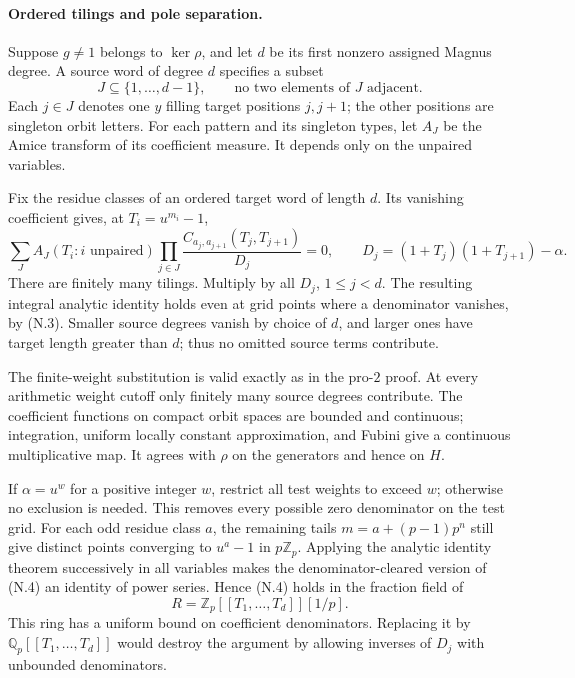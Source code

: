 \documentclass[11pt,a4paper]{article}
\theoremstyle{definition}
\begin{document}
\paragraph{Ordered tilings and pole separation.}
Suppose $g\ne1$ belongs to $\ker\rho$, and let $d$ be its first nonzero assigned Magnus degree. A source word of degree $d$ specifies a subset
\[
 J\subseteq\{1,\ldots,d-1\},\qquad
 \text{no two elements of }J\text{ adjacent}.
\]
Each $j\in J$ denotes one $y$ filling target positions $j,j+1$; the other positions are singleton orbit letters. For each pattern and its singleton types, let $A_J$ be the Amice transform of its coefficient measure. It depends only on the unpaired variables.

Fix the residue classes of an ordered target word of length $d$. Its vanishing coefficient gives, at $T_i=u^{m_i}-1$,
\[
 \sum_J A_J(T_i:i\text{ unpaired})
       \prod_{j\in J}
       \frac{C_{a_j,a_{j+1}}(T_j,T_{j+1})}{D_j}=0,
 \qquad D_j=(1+T_j)(1+T_{j+1})-\alpha.                         \tag{N.4}
\]
There are finitely many tilings. Multiply by all $D_j$, $1\le j<d$. The resulting integral analytic identity holds even at grid points where a denominator vanishes, by (N.3). Smaller source degrees vanish by choice of $d$, and larger ones have target length greater than $d$; thus no omitted source terms contribute.

The finite-weight substitution is valid exactly as in the pro-$2$ proof. At every arithmetic weight cutoff only finitely many source degrees contribute. The coefficient functions on compact orbit spaces are bounded and continuous; integration, uniform locally constant approximation, and Fubini give a continuous multiplicative map. It agrees with $\rho$ on the generators and hence on $H$.

If $\alpha=u^w$ for a positive integer $w$, restrict all test weights to exceed $w$; otherwise no exclusion is needed. This removes every possible zero denominator on the test grid. For each odd residue class $a$, the remaining tails $m=a+(p-1)p^n$ still give distinct points converging to $u^a-1$ in $p\mathbb Z_p$. Applying the analytic identity theorem successively in all variables makes the denominator-cleared version of (N.4) an identity of power series. Hence (N.4) holds in the fraction field of
\[
 R=\mathbb Z_p[[T_1,\ldots,T_d]][1/p].
\]
This ring has a uniform bound on coefficient denominators. Replacing it by $\mathbb Q_p[[T_1,\ldots,T_d]]$ would destroy the argument by allowing inverses of $D_j$ with unbounded denominators.
\end{document}
